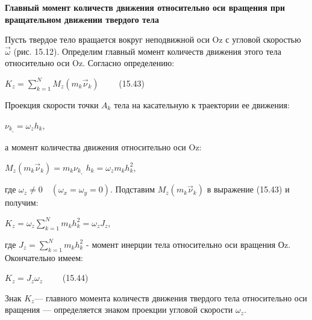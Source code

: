 {\begin{center}
    \par \textbf{Главный момент количеств движения относительно оси  вращения при вращательном движении твердого тела}

    \par Пусть твердое тело вращается вокруг неподвижной оси Oz с угловой скоростью $\vec{\omega}$ (рис. 15.12). Определим главный момент количеств движения этого тела относительно оси Oz. Согласно определению:

    \par $K_z=\sum\limits_{k=1}^N M_z(m_k \vec{\nu}_k) \qquad$ (15.43)

    \par Проекция  скорости  точки $A_k$  тела  на касательную к траектории ее движения:

    \par $\nu_{k}__{\tau}=\omega_z h_k,$

    \par а момент количества движения относительно оси Oz:

    \par $M_z(m_k \vec{\nu}_k)=m_k\nu_{k}__{\tau}$ $h_{k}=\omega_z m_k h_k^{2},$

    \par где $\omega_z \neq 0 \quad (\omega_x = \omega_y = 0).$ Подставим $M_z(m_k \vec{\nu}_k)$ в выражение (15.43) и получим:

    \par $K_z=\omega_z \sum\limits_{k=1}^N m_k h_k^{2} = \omega_z J_z$, 

    \par где $J_z=\sum\limits_{k=1}^N m_k h_k^{2}$ - момент инерции тела относительно оси вращения Оz. Окончательно имеем:

    \par $K_z=J_z\omega_z \qquad$ (15.44)

    \par Знак $K_z$— главного момента количеств движения твердого тела относительно оси вращения — определяется знаком проекции угловой скорости $\omega_z$.


\end{center}}
